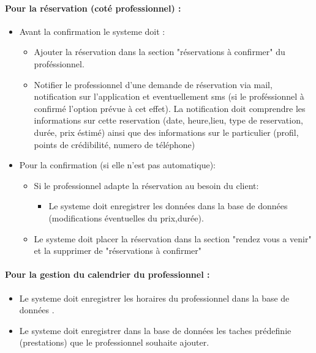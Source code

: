 \documentclass{article}
\begin{document}
\paragraph{Pour la réservation (coté professionnel) :}
\begin{itemize}
\item Avant la confirmation le systeme doit :
	\begin{itemize}
	\item Ajouter la réservation dans la section "réservations à confirmer" du  proféssionnel.
    \item Notifier le professionnel d'une demande de réservation via mail, notification sur l'application et eventuellement sms (si le proféssionnel à confirmé l'option prévue à cet effet).
		La notification doit comprendre les informations sur cette reservation (date, heure,lieu, type de reservation, durée, prix éstimé)
		ainsi que des informations sur le particulier (profil, points de crédibilité, numero de téléphone)
	\end{itemize}
\item Pour la confirmation (si elle n'est pas automatique):
	\begin{itemize}
	\item Si le professionnel adapte la réservation au besoin du client:
		\begin{itemize}
		\item Le systeme doit enregistrer les données dans la base de données (modifications éventuelles du prix,durée).
		\end{itemize}
	\end{itemize}
	\begin{itemize}
    \item Le systeme doit placer la réservation dans la section "rendez vous a venir" et la supprimer de "réservations à confirmer"
	\end{itemize}
\end{itemize}






\paragraph{Pour la gestion du calendrier du professionnel :}
\begin{itemize}
\item Le systeme doit enregistrer les horaires du professionnel dans
  la base de données .
\item Le systeme doit enregistrer dans la base de données les taches
  prédefinie (prestations) que le professionnel souhaite ajouter.
\end{itemize}
\end{document}
